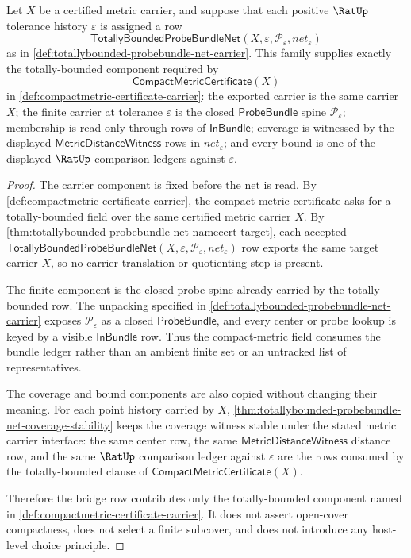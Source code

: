 \begin{theorem}
\label{thm:totallybounded-compactmetric-component-bridge}
Let $X$ be a certified metric carrier, and suppose that each positive
$\RatUp$ tolerance history $\varepsilon$ is assigned a row
$$
\mathsf{TotallyBoundedProbeBundleNet}(X,\varepsilon,\mathcal{P}_{\varepsilon},net_{\varepsilon})
$$
as in \autoref{def:totallybounded-probebundle-net-carrier}. This family supplies exactly the totally-bounded component required by
$$
\mathsf{CompactMetricCertificate}(X)
$$
in \autoref{def:compactmetric-certificate-carrier}: the exported carrier is the same carrier $X$; the finite carrier at tolerance $\varepsilon$ is the closed $\mathsf{ProbeBundle}$ spine $\mathcal{P}_{\varepsilon}$; membership is read only through rows of $\mathsf{InBundle}$; coverage is witnessed by the displayed $\mathsf{MetricDistanceWitness}$ rows in $net_{\varepsilon}$; and every bound is one of the displayed $\RatUp$ comparison ledgers against $\varepsilon$.
\end{theorem}
\begin{proof}
The carrier component is fixed before the net is read. By \autoref{def:compactmetric-certificate-carrier}, the compact-metric certificate asks for a totally-bounded field over the same certified metric carrier $X$. By \autoref{thm:totallybounded-probebundle-net-namecert-target}, each accepted $\mathsf{TotallyBoundedProbeBundleNet}(X,\varepsilon,\mathcal{P}_{\varepsilon},net_{\varepsilon})$ row exports the same target carrier $X$, so no carrier translation or quotienting step is present.

The finite component is the closed probe spine already carried by the totally-bounded row. The unpacking specified in \autoref{def:totallybounded-probebundle-net-carrier} exposes $\mathcal{P}_{\varepsilon}$ as a closed $\mathsf{ProbeBundle}$, and every center or probe lookup is keyed by a visible $\mathsf{InBundle}$ row. Thus the compact-metric field consumes the bundle ledger rather than an ambient finite set or an untracked list of representatives.

The coverage and bound components are also copied without changing their meaning. For each point history carried by $X$, \autoref{thm:totallybounded-probebundle-net-coverage-stability} keeps the coverage witness stable under the stated metric carrier interface: the same center row, the same $\mathsf{MetricDistanceWitness}$ distance row, and the same $\RatUp$ comparison ledger against $\varepsilon$ are the rows consumed by the totally-bounded clause of $\mathsf{CompactMetricCertificate}(X)$.

Therefore the bridge row contributes only the totally-bounded component named in \autoref{def:compactmetric-certificate-carrier}. It does not assert open-cover compactness, does not select a finite subcover, and does not introduce any host-level choice principle.
\end{proof}
